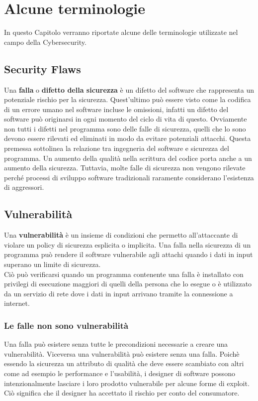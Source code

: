 \chapter{Alcune terminologie}
\label{ch:terminologie}
In questo Capitolo verranno riportate alcune delle terminologie utilizzate nel campo della Cybersecurity.

\section{Security Flaws}
Una \textbf{falla} o \textbf{difetto della sicurezza} è un difetto del software che rappresenta un potenziale rischio per la sicurezza. Quest'ultimo può essere visto come la codifica di un errore umano nel software incluse le omissioni, infatti un difetto del software può originarsi in ogni momento del ciclo di vita di questo. Ovviamente non tutti i difetti nel programma sono delle falle di sicurezza, quelli che lo sono devono essere rilevati ed eliminati in modo da evitare potenziali attacchi. Questa premessa sottolinea la relazione tra ingegneria del software e sicurezza del programma. Un aumento della qualità nella scrittura del codice porta anche a un aumento della sicurezza. Tuttavia, molte falle di sicurezza non vengono rilevate perché processi di sviluppo software tradizionali raramente considerano l'esistenza di aggressori.

\section{Vulnerabilità}
Una \textbf{vulnerabilità} è un insieme di condizioni che permetto all'attaccante di violare un policy di sicurezza esplicita o implicita. Una falla nella sicurezza di un programma può rendere il software vulnerabile agli attachi quando i dati in input superano un limite di sicurezza.\\
Ciò può verificarsi quando un programma contenente una falla è installato con privilegi di esecuzione maggiori di quelli della persona che lo esegue o è utilizzato da un servizio di rete dove i dati in input arrivano tramite la connessione a internet.

\subsection{Le falle non sono vulnerabilità}
Una falla può esistere senza tutte le precondizioni necessarie a creare una vulnerabilità. Viceversa una vulnerabilità può esistere senza una falla. Poichè essendo la sicurezza un attributo di qualità che deve essere scambiato con altri come ad esempio le performance e l'usabilità, i designer di software possono intenzionalmente lasciare i loro prodotto vulnerabile per alcune forme di exploit. Ciò significa che il designer ha accettato il rischio per conto del consumatore.


